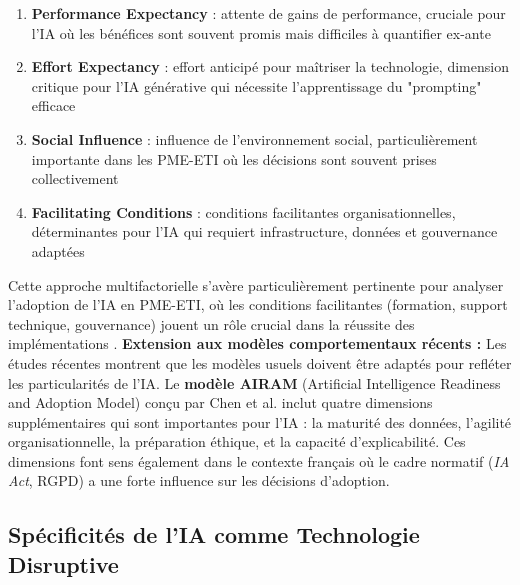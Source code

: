 \begin{enumerate}
    \item \textbf{Performance Expectancy} : attente de gains de performance, cruciale pour l'IA où les bénéfices sont souvent promis mais difficiles à quantifier ex-ante
    \item \textbf{Effort Expectancy} : effort anticipé pour maîtriser la technologie, dimension critique pour l'IA générative qui nécessite l'apprentissage du "prompting" efficace
    \item \textbf{Social Influence} : influence de l'environnement social, particulièrement importante dans les PME-ETI où les décisions sont souvent prises collectivement
    \item \textbf{Facilitating Conditions} : conditions facilitantes organisationnelles, déterminantes pour l'IA qui requiert infrastructure, données et gouvernance adaptées
\end{enumerate}
\medskip
Cette approche multifactorielle s'avère particulièrement pertinente pour analyser l'adoption de l'IA en PME-ETI, où les conditions facilitantes (formation, support technique, gouvernance) jouent un rôle crucial dans la réussite des implémentations \cite{vorecol2024resistance}.
\medskip
\textbf{Extension aux modèles comportementaux récents :} Les études récentes montrent que les modèles usuels doivent être adaptés pour refléter les particularités de l’IA.  
Le \textbf{modèle AIRAM} (Artificial Intelligence Readiness and Adoption Model) conçu par Chen et al. \cite{chen2024airam} inclut quatre dimensions supplémentaires qui sont importantes pour l’IA : la maturité des données, l’agilité organisationnelle, la préparation éthique, et la capacité d’explicabilité.  
Ces dimensions font sens également dans le contexte français où le cadre normatif (\textit{IA Act}, RGPD) a une forte influence sur les décisions d’adoption.

\subsection{Spécificités de l'IA comme Technologie Disruptive}

